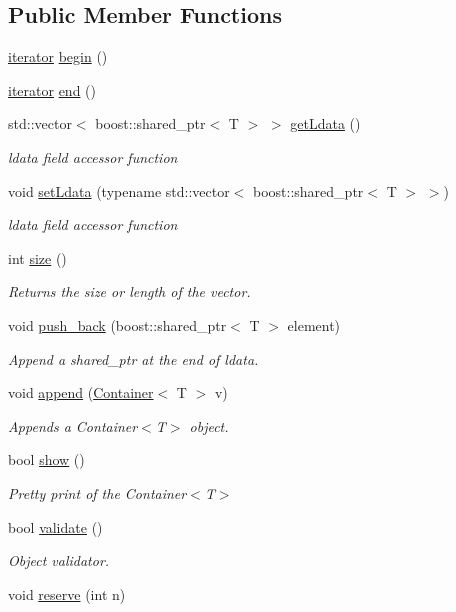 \subsection*{Public Member Functions}
\begin{DoxyCompactItemize}
\item 
\hyperlink{class_container_a9baa5c3be9ea8fb85a4fd43f29ab7504}{iterator} \hyperlink{class_container_a9ad6802d12bf5f48400bc346de37ad0f}{begin} ()
\item 
\hyperlink{class_container_a9baa5c3be9ea8fb85a4fd43f29ab7504}{iterator} \hyperlink{class_container_a769250b7546b782007f1adaba8a07336}{end} ()
\item 
std::vector$<$ boost::shared\_\-ptr$<$ T $>$ $>$ \hyperlink{class_container_a6fb8ecb9656c1732dbbc8d5a8a98f14d}{getLdata} ()
\begin{DoxyCompactList}\small\item\em ldata field accessor function \end{DoxyCompactList}\item 
void \hyperlink{class_container_a9ba632f4fc005eca7a7cb4c7616a7796}{setLdata} (typename std::vector$<$ boost::shared\_\-ptr$<$ T $>$ $>$)
\begin{DoxyCompactList}\small\item\em ldata field accessor function \end{DoxyCompactList}\item 
int \hyperlink{class_container_aef8dda28fbfe205ce25ae824d84bb1c9}{size} ()
\begin{DoxyCompactList}\small\item\em Returns the size or length of the vector. \end{DoxyCompactList}\item 
void \hyperlink{class_container_afd87c69cb799ed7b434c29090083a285}{push\_\-back} (boost::shared\_\-ptr$<$ T $>$ element)
\begin{DoxyCompactList}\small\item\em Append a shared\_\-ptr at the end of ldata. \end{DoxyCompactList}\item 
void \hyperlink{class_container_ae763eb37b721d401327c97016fb2fa54}{append} (\hyperlink{class_container}{Container}$<$ T $>$ v)
\begin{DoxyCompactList}\small\item\em Appends a Container$<$T$>$ object. \end{DoxyCompactList}\item 
bool \hyperlink{class_container_ad72379ee222b073a5eecec7fc1bedfc2}{show} ()
\begin{DoxyCompactList}\small\item\em Pretty print of the Container$<$T$>$ \end{DoxyCompactList}\item 
bool \hyperlink{class_container_aa99a036fd0fe6d6b82ba558157e557d3}{validate} ()
\begin{DoxyCompactList}\small\item\em Object validator. \end{DoxyCompactList}\item 
void \hyperlink{class_container_aa3cbae68ebeed649c52eb3805a30fb75}{reserve} (int n)
\end{DoxyCompactItemize}
